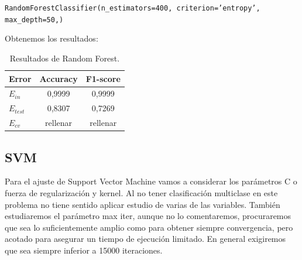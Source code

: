 \documentclass[11pt,a4paper]{article}
\begin{document}
{\begin{center}
    \texttt{RandomForestClassifier(n\_estimators=400, criterion='entropy', max\_depth=50,)}\end{center}}
    
Obtenemos los resultados:

\begin{table}[h]
\begin{center}
\begin{tabular}{|l|c|c|}
\hline
  Error & Accuracy & F1-score \\ \hline
  $E_{in}$ & 0,9999 & 0,9999 \\
  $E_{test}$ & 0,8307 & 0,7269  \\
  $E_{cv}$ & rellenar & rellenar  \\\hline
\end{tabular}
\caption{Resultados de Random Forest.}
\end{center}
\end{table}

\newpage
\subsection{SVM}

Para el ajuste de Support Vector Machine vamos a considerar los parámetros C o fuerza de regularización y kernel. Al no tener clasificación multiclase en este problema no tiene sentido aplicar estudio de varias de las variables. También estudiaremos el parámetro max iter, aunque no lo comentaremos, procuraremos que sea lo suficientemente amplio como para obtener siempre convergencia, pero acotado para asegurar un tiempo de ejecución limitado. En general exigiremos que sea siempre inferior a 15000 iteraciones.
\end{document}
